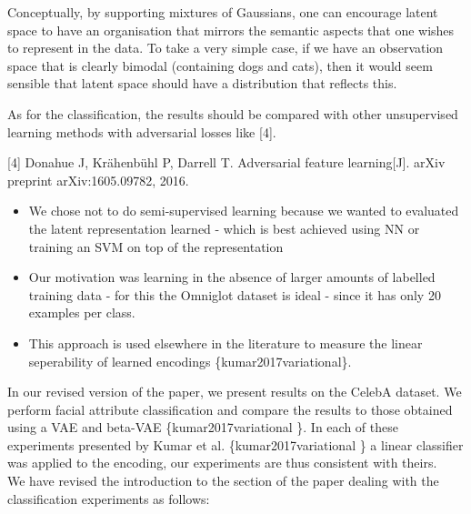 \documentclass[a4paper,11pt]{article}
\begin{document}
Conceptually, by supporting mixtures of Gaussians, one can encourage latent space to have an organisation that mirrors the semantic aspects that one wishes to represent in the data.  To take a very simple case, if we have an observation space that is clearly bimodal (containing dogs and cats), then it would seem sensible that latent space should have a distribution that reflects this.\\



{\color{blue}
As for the classification, the results should be compared with other unsupervised learning methods with adversarial losses like [4].

[4] Donahue J, Krähenbühl P, Darrell T. Adversarial feature learning[J]. arXiv preprint arXiv:1605.09782, 2016.}

\begin{itemize}
    \item We chose not to do semi-supervised learning because we wanted to evaluated the latent representation learned - which is best achieved using NN or training an SVM on top of the representation
    \item Our motivation was learning in the absence of larger amounts of labelled training data - for this the Omniglot dataset is ideal - since it has only 20 examples per class.
    \item This approach is used elsewhere in the literature to measure the linear seperability of learned encodings \{kumar2017variational\}.
\end{itemize}

In our revised version of the paper, we present results on the CelebA dataset. We perform facial attribute classification and compare the results to those obtained using a VAE and beta-VAE \{kumar2017variational \}. In each of these experiments presented by Kumar et al. \{kumar2017variational \} a linear classifier was applied to the encoding, our experiments are thus consistent with theirs. \\

We have revised the introduction to the section of the paper dealing with the classification experiments as follows:
\end{document}
